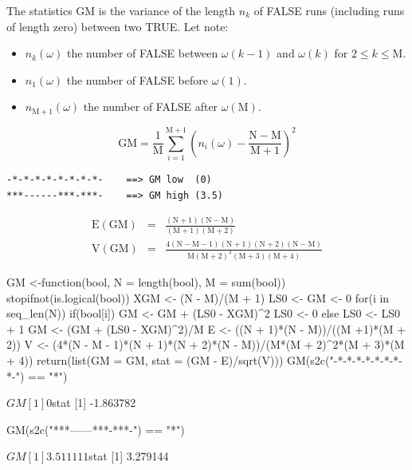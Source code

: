 \documentclass{article}
\begin{document}
The statistics $\mathrm{GM}$ is the variance of the length $n_k$ of FALSE runs (including
runs of length zero) between two TRUE. Let note:

\begin{itemize}
\item $n_k(\omega)$ the number of FALSE between $\omega(k-1)$ and $\omega(k)$ for $2 \le k \le \mathrm{M}$.
\item $n_1(\omega)$ the number of FALSE before $\omega(1)$.
\item $n_{\mathrm{M+1}}(\omega)$ the number of FALSE after $\omega(\mathrm{M})$.
\end{itemize}

$$
\mathrm{GM} = \frac{1}{\mathrm{M}}\sum_{i = 1}^{\mathrm{M+1}}{\left( n_i(\omega) - \mathrm{\frac{N-M}{M+1}} \right)^2}
$$

\begin{verbatim}
-*-*-*-*-*-*-*-*-    ==> GM low  (0)
***------***-***-    ==> GM high (3.5)
\end{verbatim}

\begin{eqnarray*}
\mathrm{E(GM)} & = & \mathrm{\frac{(N + 1)(N - M)}{(M +1)(M + 2)}} \\
\mathrm{V(GM)} & = & \mathrm{\frac{4(N - M - 1)(N + 1)(N + 2)(N - M)}{M(M + 2)^2(M + 3)(M + 4)}}
\end{eqnarray*}

\begin{Schunk}
\begin{Sinput}
 GM <-function(bool, N = length(bool), M = sum(bool)){
 	stopifnot(is.logical(bool))
 	XGM <- (N - M)/(M + 1)
 	LS0 <- GM <- 0
 	for(i in seq_len(N)){
 		if(bool[i]){
 			GM <- GM + (LS0 - XGM)^2
 			LS0 <- 0
 		} else {
 			LS0 <- LS0 + 1
 		}
 	}
 	GM <- (GM + (LS0 - XGM)^2)/M
 	E <- ((N + 1)*(N - M))/((M +1)*(M + 2))
   V <- (4*(N - M - 1)*(N + 1)*(N + 2)*(N - M))/(M*(M + 2)^2*(M + 3)*(M + 4))
 	return(list(GM = GM, stat = (GM - E)/sqrt(V)))
 }
 GM(s2c("-*-*-*-*-*-*-*-*-") == "*")
\end{Sinput}
\begin{Soutput}
$GM
[1] 0

$stat
[1] -1.863782
\end{Soutput}
\begin{Sinput}
 GM(s2c("***------***-***-") == "*")
\end{Sinput}
\begin{Soutput}
$GM
[1] 3.511111

$stat
[1] 3.279144
\end{Soutput}
\end{Schunk}
\end{document}
